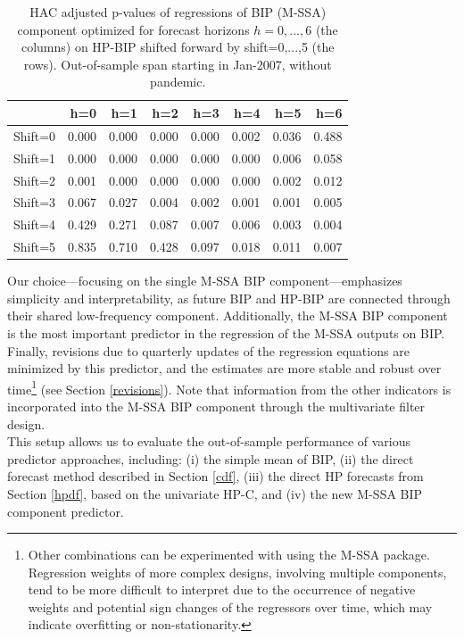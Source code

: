 \documentclass[a4paper]{article}
\begin{document}
\begin{table}[ht]
\centering
\begin{tabular}{rrrrrrrr}
  \hline
 & h=0 & h=1 & h=2 & h=3 & h=4 & h=5 & h=6 \\ 
  \hline
Shift=0 & 0.000 & 0.000 & 0.000 & 0.000 & 0.002 & 0.036 & 0.488 \\ 
  Shift=1 & 0.000 & 0.000 & 0.000 & 0.000 & 0.000 & 0.006 & 0.058 \\ 
  Shift=2 & 0.001 & 0.000 & 0.000 & 0.000 & 0.000 & 0.002 & 0.012 \\ 
  Shift=3 & 0.067 & 0.027 & 0.004 & 0.002 & 0.001 & 0.001 & 0.005 \\ 
  Shift=4 & 0.429 & 0.271 & 0.087 & 0.007 & 0.006 & 0.003 & 0.004 \\ 
  Shift=5 & 0.835 & 0.710 & 0.428 & 0.097 & 0.018 & 0.011 & 0.007 \\ 
   \hline
\end{tabular}
\caption{HAC adjusted p-values of regressions of BIP (M-SSA) component optimized for forecast horizons $h=0,...,6$  (the columns) on HP-BIP shifted forward by shift=0,...,5 (the rows). Out-of-sample span starting in Jan-2007, without pandemic.} 
\label{p_val_hpbip_wc}
\end{table}Our choice—focusing on the single M-SSA BIP component—emphasizes simplicity and interpretability, as future BIP and HP-BIP are connected through their shared low-frequency component. Additionally, the M-SSA BIP component is the most important predictor in the regression of the M-SSA outputs on BIP.  Finally, revisions due to quarterly updates of the regression equations are minimized by this predictor, and the estimates are more stable and robust over time\footnote{Other combinations can be experimented with using the M-SSA package. Regression weights of more complex designs, involving multiple components, tend to be more difficult to interpret due to the occurrence of negative weights and potential sign changes of the regressors over time, which may indicate overfitting or non-stationarity.} (see Section \eqref{revisions}). Note that information from the other  indicators is incorporated into the M-SSA BIP component through the multivariate filter design.\\



This setup allows us to evaluate the out-of-sample performance of various predictor approaches, including: (i) the simple mean of BIP, (ii) the direct forecast method described in Section \eqref{cdf}, (iii) the direct HP forecasts from Section \eqref{hpdf}, based on the univariate HP-C, and (iv) the new M-SSA BIP component predictor. %
\end{document}
